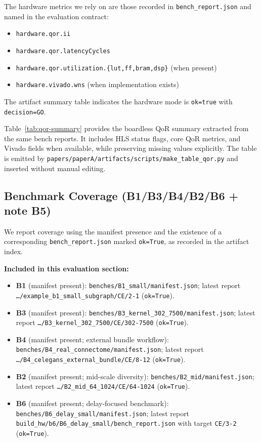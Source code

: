 The hardware metrics we rely on are those recorded in \texttt{bench\_report.json} and named in the evaluation contract:
\begin{itemize}
\item \texttt{hardware.qor.ii}
\item \texttt{hardware.qor.latencyCycles}
\item \texttt{hardware.qor.utilization.\{lut,ff,bram,dsp\}} (when present)
\item \texttt{hardware.vivado.wns} (when implementation exists)
\end{itemize}

The artifact summary table indicates the hardware mode is \texttt{ok=true} with \texttt{decision=GO}.

Table~\ref{tab:qor-summary} provides the boardless QoR summary extracted from the same bench reports. It includes HLS status flags, core QoR metrics, and Vivado fields when available, while preserving missing values explicitly. The table is emitted by \texttt{papers/paperA/artifacts/scripts/make\_table\_qor.py} and inserted without manual editing.

\begin{table}[t]
\centering
\scriptsize

\caption{QoR summary (boardless) generated from \texttt{bench\_report.json} artifacts (\texttt{results\_qor.tex}).}
\label{tab:qor-summary}
\end{table}

\subsection{Benchmark Coverage (B1/B3/B4/B2/B6 + note B5)}

We report coverage using the manifest presence and the existence of a corresponding \texttt{bench\_report.json} marked \texttt{ok=True}, as recorded in the artifact index.

\textbf{Included in this evaluation section:}
\begin{itemize}
\item \textbf{B1} (manifest present): \texttt{benches/B1\_small/manifest.json}; latest report \texttt{\ldots/example\_b1\_small\_subgraph/CE/2-1} (\texttt{ok=True}).
\item \textbf{B3} (manifest present): \texttt{benches/B3\_kernel\_302\_7500/manifest.json}; latest report \texttt{\ldots/B3\_kernel\_302\_7500/CE/302-7500} (\texttt{ok=True}).
\item \textbf{B4} (manifest present; external bundle workflow): \texttt{benches/B4\_real\_connectome/manifest.json}; latest report \texttt{\ldots/B4\_celegans\_external\_bundle/CE/8-12} (\texttt{ok=True}).
\item \textbf{B2} (manifest present; mid-scale diversity): \texttt{benches/B2\_mid/manifest.json}; latest report \texttt{\ldots/B2\_mid\_64\_1024/CE/64-1024} (\texttt{ok=True}).
\item \textbf{B6} (manifest present; delay-focused benchmark): \texttt{benches/B6\_delay\_small/manifest.json}; latest report \texttt{build\_hw/b6/B6\_delay\_small/bench\_report.json} with target \texttt{CE/3-2} (\texttt{ok=True}).
\end{itemize}

